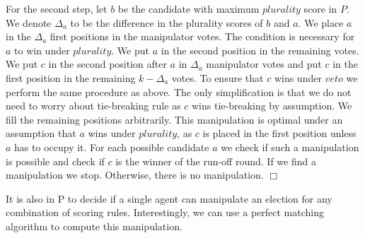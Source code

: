 \documentclass{ecai2012}
\newcommand{\myqed}{\mbox{$\Box$}}
\begin{document}
For the second step, let $b$ be the candidate with maximum $plurality$ score in $P$.
We denote $\Delta_{a}$ to be the difference in the plurality scores
of $b$ and $a$.
We place $a$ in the $\Delta_{a}$ first positions in the manipulator votes.
The condition is necessary for $a$ to win under $plurality$.
We put $a$ in the second position in the remaining votes.
We put $c$ in the second position after $a$ in $\Delta_{a}$ manipulator
votes and put $c$ in the first position in the remaining $k-\Delta_{a}$
votes.
To ensure that  $c$ wins under $veto$ we perform the same procedure
as above. The only simplification is
that we do not need to worry about tie-breaking rule as
$c$ wins tie-breaking by assumption.
We fill the remaining positions arbitrarily.
This manipulation is optimal under an assumption
that $a$ wins under $plurality$, as $c$ is placed in the first position
unless $a$ has to occupy it.
For each possible candidate $a$ we check
if such a manipulation is possible and check if $c$ is the winner of
the run-off round. If we find a manipulation we stop. Otherwise,
there is no manipulation.
\myqed

It is also in P to decide if a single agent can manipulate
an election for any combination
of scoring rules. Interestingly, we can
use a perfect matching algorithm to compute
this manipulation.
\end{document}

